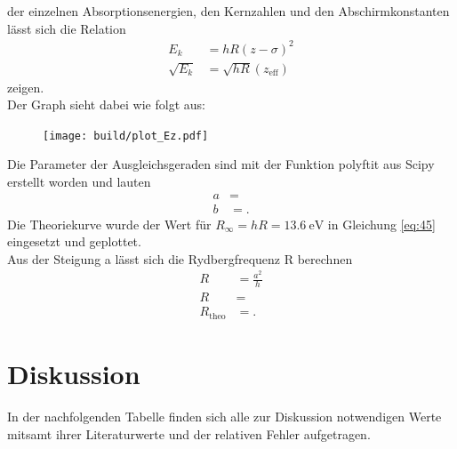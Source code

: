 \justifying der einzelnen Absorptionsenergien, den Kernzahlen und den Abschirmkonstanten
lässt sich die Relation \cite{V602}
\begin{align}
    E_k &= hR (z-\sigma)^2 \label{eq:45}\\
    \sqrt{E_k}&=\sqrt{hR} (z_{\text{eff}} ) \label{eq:46}
\end{align}
zeigen.\\
Der Graph sieht dabei wie folgt aus:
\begin{figure}[H]
    \centering
    \texttt{[image: build/plot\_Ez.pdf]}
    \caption{ \cite{matplotlib}}
    \label{fig:10}
\end{figure}
Die Parameter der Ausgleichsgeraden sind mit der Funktion polyftit aus Scipy erstellt
worden und lauten
\begin{align}
    a &= \text{} \label{eq:47} \\
    b &= \text{} \label{eq:48}.
\end{align}
Die Theoriekurve wurde der Wert für $R_{\infty}=hR=\SI{13.6}{\electronvolt} $ in 
Gleichung \eqref{eq:45} eingesetzt und geplottet.\\
Aus der Steigung a lässt sich die Rydbergfrequenz R berechnen
\begin{align}
    R&=\frac{a^2}{h} \label{eq:49}\\
    R&= \text{} \label{eq:50}\\
    R_{\text{theo}}&= \text{} \label{eq:51}.
\end{align}


\section{Diskussion}

In der nachfolgenden Tabelle finden sich alle zur Diskussion notwendigen Werte
mitsamt ihrer Literaturwerte und der relativen Fehler aufgetragen.

